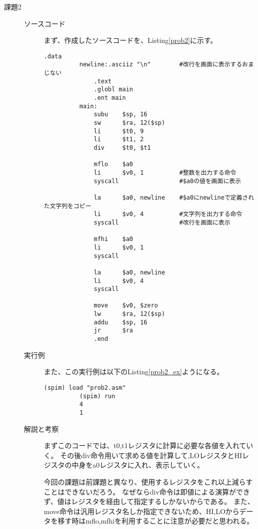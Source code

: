 \documentclass{jsarticle}
\begin{document}
\begin{description}
      \item[課題2]
      \begin{description}
          \item[ソースコード]
          まず、作成したソースコードを、Listing\ref{prob2}に示す。
          \begin{lstlisting}[caption=課題2のソースコード, label=prob2]
              .data
          newline:.asciiz "\n"        #改行を画面に表示するおまじない
              .text
              .globl main
              .ent main
          main:
              subu    $sp, 16
              sw      $ra, 12($sp)
              li      $t0, 9
              li      $t1, 2
              div     $t0, $t1

              mflo    $a0
              li      $v0, 1          #整数を出力する命令
              syscall                 #$a0の値を画面に表示

              la      $a0, newline    #$a0にnewlineで定義された文字列をコピー
              li      $v0, 4          #文字列を出力する命令
              syscall                 #改行を画面に表示

              mfhi    $a0
              li      $v0, 1
              syscall

              la      $a0, newline
              li      $v0, 4
              syscall

              move    $v0, $zero
              lw      $ra, 12($sp)
              addu    $sp, 16
              jr      $ra
              .end
          \end{lstlisting}

          \item[実行例]
          また、この実行例は以下のListing\ref{prob2_ex}ようになる。
          \begin{lstlisting}[caption=課題2の実行例, label=prob2_ex]
          (spim) load "prob2.asm"
          (spim) run
          4
          1
          \end{lstlisting}

          \item[解説と考察]
          まずこのコードでは、t0,t1レジスタに計算に必要な各値を入れていく。
          その後div命令用いて求める値を計算して,LOレジスタとHIレジスタの中身をa0レジスタに入れ、表示していく。

          今回の課題は前課題と異なり、使用するレジスタをこれ以上減らすことはできないだろう。
          なぜならdiv命令は即値による演算ができず、値はレジスタを経由して指定するしかないからである。
          また、move命令は汎用レジスタ名しか指定できないため、HI,LOからデータを移す時はmflo,mfhiを利用することに注意が必要だと思われる。
          \\
      \end{description}


\end{description}
\end{document}
